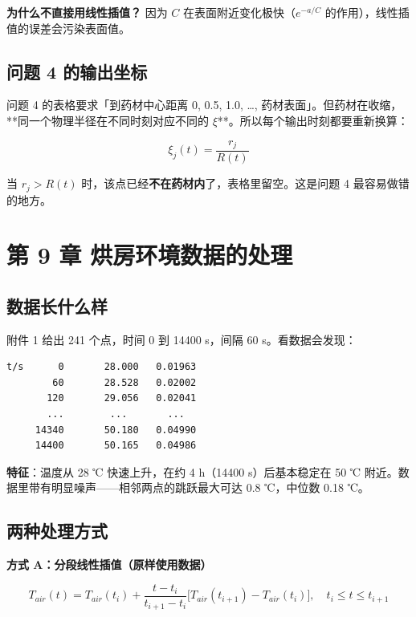 \textbf{为什么不直接用线性插值？} 因为 $C$ 在表面附近变化极快（$e^{-a/C}$ 的作用），线性插值的误差会污染表面值。


\subsection{问题 4 的输出坐标}


问题 4 的表格要求「到药材中心距离 0, 0.5, 1.0, …, 药材表面」。但药材在收缩，**同一个物理半径在不同时刻对应不同的 $\xi$**。所以每个输出时刻都要重新换算：


\begin{equation}
\xi_j(t)=\frac{r_j}{R(t)}\tag{8.3}
\end{equation}


当 $r_j>R(t)$ 时，该点已经\textbf{不在药材内}了，表格里留空。这是问题 4 最容易做错的地方。



\section{第 9 章 烘房环境数据的处理}


\subsection{数据长什么样}


附件 1 给出 241 个点，时间 0 到 14400 s，间隔 60 s。看数据会发现：


\begin{lstlisting}
t/s      0       28.000   0.01963
        60       28.528   0.02002
       120       29.056   0.02041
       ...        ...       ...
     14340       50.180   0.04990
     14400       50.165   0.04986
\end{lstlisting}


\textbf{特征}：温度从 28 ℃ 快速上升，在约 4 h（14400 s）后基本稳定在 50 ℃ 附近。数据里带有明显噪声——相邻两点的跳跃最大可达 0.8 ℃，中位数 0.18 ℃。


\subsection{两种处理方式}


\textbf{方式 A：分段线性插值（原样使用数据）}


\begin{equation*}
T_{air}(t)=T_{air}(t_i)+\frac{t-t_i}{t_{i+1}-t_i}\big[T_{air}(t_{i+1})-T_{air}(t_i)\big],\quad t_i\le t\le t_{i+1}
\end{equation*}


